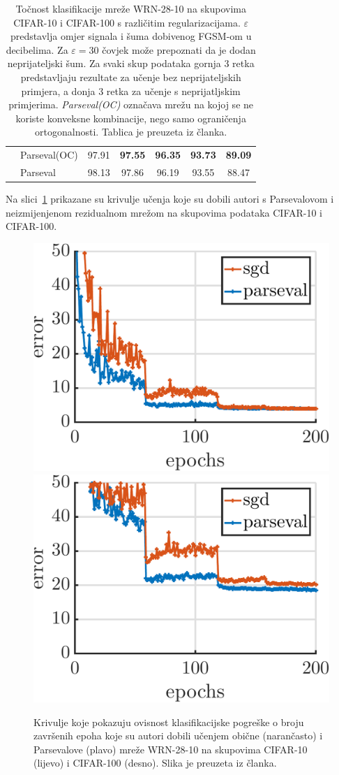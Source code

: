 \documentclass[utf8, seminar, numeric, lmodern]{feri}
\begin{document}
\begin{table}[h!]
\begin{center}
\begin{tabular}{|c|l|c|c|c|c|c|}
			& Parseval(OC)
			& 97.91       & \textbf{97.55}        & \textbf{96.35}         & \textbf{93.73}         & \textbf{89.09}      \\
			& Parseval
			& 98.13        & 97.86        & 96.19         & 93.55         & 88.47      \\
			\cline{2-7}
			\hline
		\end{tabular}
		\egroup
	\end{center}
	\caption{
	Točnost klasifikacije mreže WRN-28-10 na skupovima CIFAR-10 i CIFAR-100 s različitim regularizacijama. $\varepsilon$ predstavlja omjer signala i šuma dobivenog FGSM-om u decibelima. Za $\varepsilon=30$ čovjek može prepoznati da je dodan neprijateljski šum. Za svaki skup podataka gornja 3 retka predstavljaju rezultate za učenje bez neprijateljskih primjera, a donja 3 retka za učenje s neprijatljskim primjerima. \emph{Parseval(OC)} označava mrežu na kojoj se ne koriste konveksne kombinacije, nego samo ograničenja ortogonalnosti. Tablica je preuzeta iz članka.
	}\label{tab:adv-robustness}
\end{table}

Na slici~\ref{fig:krivulje-pogreske} prikazane su krivulje učenja koje su dobili autori s Parsevalovom i neizmijenjenom rezidualnom mrežom na skupovima podataka CIFAR-10 i CIFAR-100.

\begin{figure}[htbp]
	\centering
	\includegraphics[width=0.49\linewidth]{ilustracije/convergence/cifar10.pdf}
	\includegraphics[width=0.49\linewidth]{ilustracije/convergence/cifar100.pdf}
	\caption{
		Krivulje koje pokazuju ovisnost klasifikacijske pogreške o broju završenih epoha koje su autori dobili učenjem obične (narančasto) i Parsevalove (plavo) mreže WRN-28-10 na skupovima CIFAR-10 (lijevo) i CIFAR-100 (desno). Slika je preuzeta iz članka.
	}
	\label{fig:krivulje-pogreske}
\end{figure}
\end{document}
